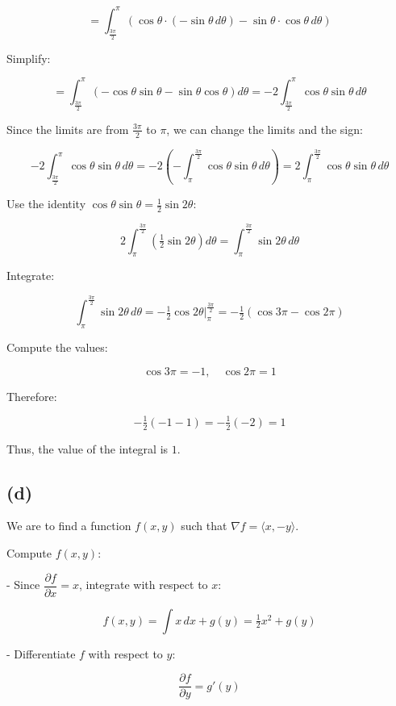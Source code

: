 \documentclass[11pt]{article}
\begin{document}
\[
= \int_{\tfrac{3\pi}{2}}^{\pi} \left( \cos \theta \cdot \left( -\sin \theta \, d\theta \right) - \sin \theta \cdot \cos \theta \, d\theta \right)
\]

Simplify:

\[
= \int_{\tfrac{3\pi}{2}}^{\pi} \left( -\cos \theta \sin \theta - \sin \theta \cos \theta \right) d\theta = -2 \int_{\tfrac{3\pi}{2}}^{\pi} \cos \theta \sin \theta \, d\theta
\]

Since the limits are from $\tfrac{3\pi}{2}$ to $\pi$, we can change the limits and the sign:

\[
-2 \int_{\tfrac{3\pi}{2}}^{\pi} \cos \theta \sin \theta \, d\theta = -2 \left( - \int_{\pi}^{\tfrac{3\pi}{2}} \cos \theta \sin \theta \, d\theta \right) = 2 \int_{\pi}^{\tfrac{3\pi}{2}} \cos \theta \sin \theta \, d\theta
\]

Use the identity $\cos \theta \sin \theta = \tfrac{1}{2} \sin 2\theta$:

\[
2 \int_{\pi}^{\tfrac{3\pi}{2}} \left( \tfrac{1}{2} \sin 2\theta \right) d\theta = \int_{\pi}^{\tfrac{3\pi}{2}} \sin 2\theta \, d\theta
\]

Integrate:

\[
\int_{\pi}^{\tfrac{3\pi}{2}} \sin 2\theta \, d\theta = -\tfrac{1}{2} \cos 2\theta \Big|_{\pi}^{\tfrac{3\pi}{2}} = -\tfrac{1}{2} \left( \cos 3\pi - \cos 2\pi \right)
\]

Compute the values:

\[
\cos 3\pi = -1, \quad \cos 2\pi = 1
\]

Therefore:

\[
-\tfrac{1}{2} \left( -1 - 1 \right) = -\tfrac{1}{2} (-2) = 1
\]

Thus, the value of the integral is $\boxed{1}$.

\newpage

\subsection{(d)}

We are to find a function $f(x, y)$ such that $\nabla f = \langle x, -y \rangle$.

Compute $f(x, y)$:

- Since $\dfrac{\partial f}{\partial x} = x$, integrate with respect to $x$:

\[
f(x, y) = \int x \, dx + g(y) = \tfrac{1}{2} x^2 + g(y)
\]

- Differentiate $f$ with respect to $y$:

\[
\dfrac{\partial f}{\partial y} = g'(y)
\]
\end{document}
